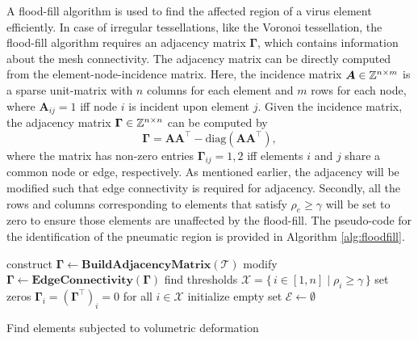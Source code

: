 A flood-fill algorithm is used \cite{Chartrand1977Jan} to find the affected region of a virus element efficiently. In case of irregular tessellations, like the Voronoi tessellation, the flood-fill algorithm requires an adjacency matrix $\boldsymbol{\Gamma}$, which contains information about the mesh connectivity. The adjacency matrix can be directly computed from the element-node-incidence matrix. Here, the incidence matrix $\boldsymbol{A} \in \mathbb{Z}^{n\times m}$ is a sparse unit-matrix with $n$ columns for each element and $m$ rows for each node, where $\boldsymbol{A}_{ij} = 1$ iff node $i$ is incident upon element $j$. Given the incidence matrix, the adjacency matrix $\boldsymbol{\Gamma}\in \mathbb{Z}^{n\times n}$ can be computed by
%
\begin{equation}
\boldsymbol{\Gamma} = \boldsymbol{A}\boldsymbol{A}^\top - \text{diag}(\boldsymbol{A}\boldsymbol{A}^\top), \label{eq:adjecency}
\end{equation}
%
where the matrix has non-zero entries $\boldsymbol{\Gamma}_{ij} = 1,2$ iff elements $i$ and $j$ share a common node or edge, respectively. As mentioned earlier, the adjacency will be modified such that edge connectivity is required for adjacency. Secondly, all the rows and columns corresponding to elements that satisfy $\rho_e \ge \gamma$ will be set to zero to ensure those elements are unaffected by the flood-fill. The pseudo-code for the identification of the pneumatic region is provided in Algorithm \ref{alg:floodfill}.

\begin{algorithm}[!t]
    construct $\boldsymbol{\Gamma}  \gets {\textbf{BuildAdjacencyMatrix}}(\mathcal{T})$\;
    modify $\boldsymbol{\Gamma}  \gets {\textbf{EdgeConnectivity}}(\boldsymbol{\Gamma})$\;
    find thresholds $\mathcal{X} = \{\, i \in [1,n] \;|\; \rho_i \ge \gamma \,\}$\;
    set zeros $\boldsymbol{\Gamma}_i = (\boldsymbol{\Gamma}^\top)_i = 0$ for all $i \in  \mathcal{X}$\;
    initialize empty set $\mathcal{E} \gets \emptyset$\;
    \caption{Find elements subjected to volumetric deformation \label{alg:floodfill}}
\end{algorithm}


